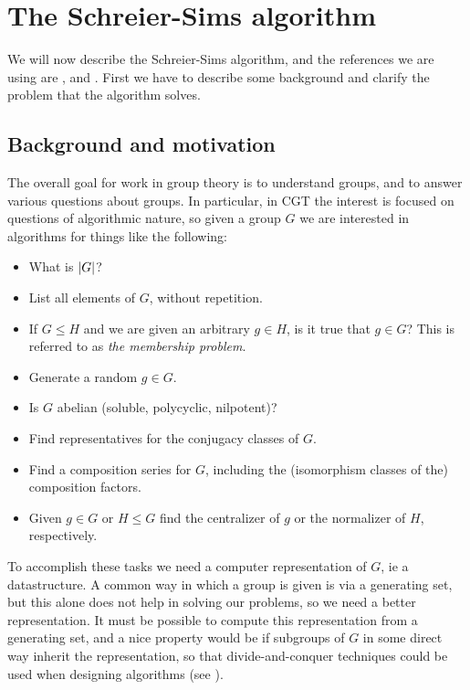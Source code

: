 \chapter{The Schreier-Sims algorithm}

We will now describe the Schreier-Sims algorithm, and the references we are using are \cite{soicher98}, \cite{seress03} and \cite{butler91}. First we have to describe some background and clarify the problem that the algorithm solves.

\section{Background and motivation} \label{ss_background}
The overall goal for work in group theory is to understand groups, and
to answer various questions about groups. In particular, in CGT the
interest is focused on questions of algorithmic nature, so given a
group $G$ we are interested in algorithms for things like the following:
\begin{itemize}
\item What is $\left\lvert G \right\rvert$?
\item List all elements of $G$, without repetition.
\item If $G \leq H$ and we are given an arbitrary $g \in H$, is it true that $g \in G$? This is referred to as \emph{the membership problem}.
\item Generate a random $g \in G$.
\item Is $G$ abelian (soluble, polycyclic, nilpotent)?
\item Find representatives for the conjugacy classes of $G$.
\item Find a composition series for $G$, including the (isomorphism classes of the) composition factors.
\item Given $g \in G$ or $H \leq G$ find the centralizer of $g$ or the normalizer of $H$, respectively.
\end{itemize}
To accomplish these tasks we need a computer representation of $G$, ie
a datastructure. A common way in which a group is given is via a
generating set, but this alone does not help in solving our problems,
so we need a better representation. It must be possible to compute
this representation from a generating set, and a nice property would
be if subgroups of $G$ in some direct way inherit the representation,
so that divide-and-conquer techniques could be used when designing
algorithms (see \cite{clr90}).

